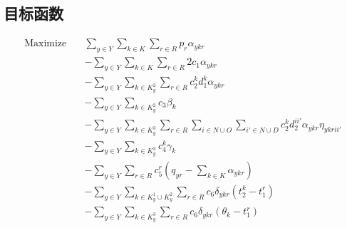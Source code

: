 \documentclass[11pt]{article}
\begin{document}
\subsection*{目标函数}
\[
\begin{aligned}
\text{Maximize} \quad & \sum_{y \in Y} \sum_{k \in K} \sum_{r \in R} p_r \alpha_{ykr} \\
& - \sum_{y \in Y} \sum_{k \in K} \sum_{r \in R} 2c_1 \alpha_{ykr} \\
& - \sum_{y \in Y} \sum_{k \in K^2_y} \sum_{r \in R} c_2^k d_1^k \alpha_{ykr} \\
& - \sum_{y \in Y} \sum_{k \in K^2_y} c_3 \beta_k \\
& - \sum_{y \in Y} \sum_{k \in K^3_y} \sum_{r \in R} \sum_{i \in N \cup O} \sum_{i' \in N \cup D} c_2^k d_2^{ii'} \alpha_{ykr} \eta_{ykrii'} \\
& - \sum_{y \in Y} \sum_{k \in K^3_y} c_4^k \gamma_k \\
& - \sum_{y \in Y} \sum_{r \in R} c_5^r \left( q_{yr} - \sum_{k \in K} \alpha_{ykr} \right) \\
& - \sum_{y \in Y} \sum_{k \in K^1_y \cup K^2_y} \sum_{r \in R} c_6 \delta_{ykr} (t_2^k - t_1^r) \\
& - \sum_{y \in Y} \sum_{k \in K^3_y} \sum_{r \in R} c_6 \delta_{ykr} (\theta_k - t_1^r)
\end{aligned}
\]
\end{document}
